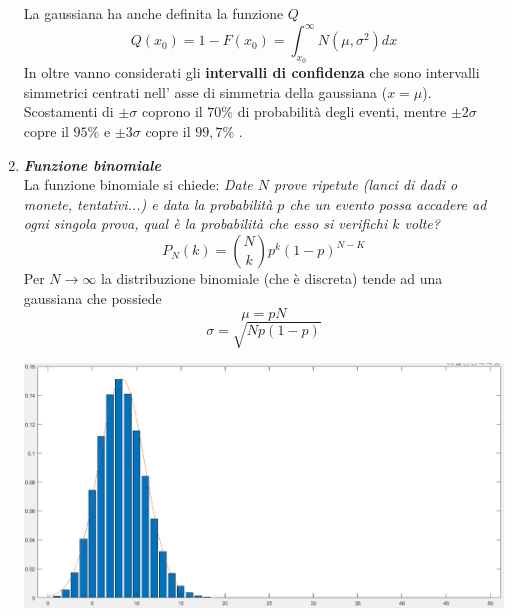 \documentclass[]{article}
\begin{document}
\begin{enumerate}
\begin{center}
\end{center}

La gaussiana ha anche definita la funzione $Q$
\[
 Q(x_0)= 1-F(x_0) = \int_{x_0}^{\infty} N(\mu,\sigma^2) dx
\]
In oltre vanno considerati gli \textbf{intervalli di confidenza} che sono intervalli simmetrici centrati nell' asse di simmetria della gaussiana ($x= \mu$). Scostamenti di $  \pm \sigma$ coprono il $70 \%$ di probabilità degli eventi, mentre $ \pm 2 \sigma$ copre il $95 \%$ e $ \pm 3 \sigma $ copre il $99,7 \%$ .

\item \textit{\textbf{Funzione binomiale}}
\\
La funzione binomiale si chiede: \textit{Date $N$ prove ripetute (lanci di dadi o monete, tentativi...) e data la probabilità $p$ che un evento possa accadere ad ogni singola prova, qual è la probabilità che esso si verifichi $k$ volte?} 
\begin{equation}
P_N(k)= \binom{N}{k} p^k (1-p)^{N-K}
\end{equation}
Per $N \to \infty$ la distribuzione binomiale (che è discreta) tende ad una gaussiana che possiede
\[
\mu= pN
\]
\[
\sigma= \sqrt{Np(1-p)}
\]

\begin{center}
\includegraphics[scale=0.2]{binomiale}
\\


\end{center}
\end{enumerate}
\end{document}
